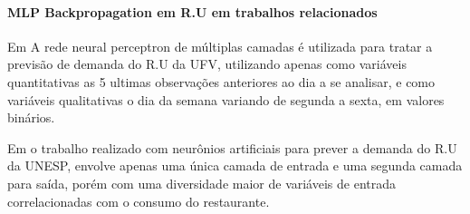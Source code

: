 \documentclass[	12pt, Times, openright, twoside, a4paper, english, brazil]{abntex2}
\begin{document}
  	       \paragraph*{MLP Backpropagation em R.U em trabalhos relacionados}
  	       Em \cite{Lopes2008} A rede neural perceptron de múltiplas camadas é utilizada para tratar a previsão de demanda do R.U da UFV, utilizando apenas como variáveis quantitativas as 5 ultimas observações anteriores ao dia a se analisar, e como variáveis qualitativas o dia da semana variando de segunda a sexta, em valores binários.
  	       
           \begin{figure}[H]
           \end{figure}
            
           Em \cite{Rocha2011} o trabalho realizado com neurônios artificiais para prever a demanda do R.U da UNESP, envolve apenas uma única camada de entrada e uma segunda camada para saída, porém com uma diversidade maior de variáveis de entrada correlacionadas com o consumo do restaurante. 
           \begin{figure}[H]
           \end{figure}
         
\end{document}
